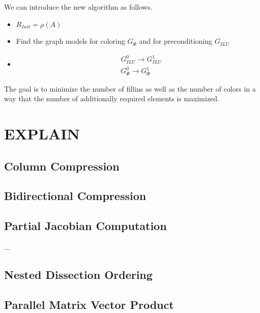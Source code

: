 \documentclass[12pt, oneside]{book}
\begin{document}
We can introduce the new algorithm as follows.
\begin{itemize}
\item $R_{Init}=\rho(A)$
\item Find the graph models for coloring $G_{\Phi}$ and for preconditioning $G_{ILU}$
\item 
\begin{align}
&G_{ILU}^{0} \rightarrow G_{ILU}^{1}\\
&G_{\Phi}^{0} \rightarrow G_{\Phi}^{1}
\end{align}
\end{itemize}
The goal is to minimize the number of fillins as well as the number of colors in a way that
the number of additionally required elements is maximized.
\chapter{EXPLAIN}
\section{Column Compression}
\cite{2013:05,2014:01}
\section{Bidirectional Compression}
\cite{2014:09}
\section{Partial Jacobian Computation}
...
\section{Nested Dissection Ordering}
\cite{2014:02}
\section{Parallel Matrix Vector Product}
\cite{2015:3}
\end{document}
